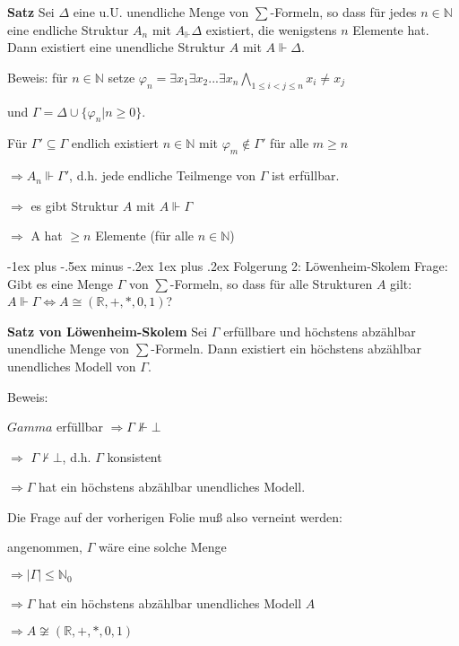\documentclass[a4paper]{article}
\makeatletter
\renewcommand{\note}[2]{\begin{noteBox} \textbf{#1} #2 \end{noteBox}}
\renewcommand{\subsubsection}{\@startsection{subsubsection}{3}{0mm}%
                {-1ex plus -.5ex minus -.2ex}%
                {1ex plus .2ex}%
                {\normalfont\small\bfseries}}
\makeatother
\begin{document}
\begin{multicols}{3}
  \note{Satz}{Sei $\Delta$ eine u.U. unendliche Menge von $\sum$-Formeln, so dass für jedes $n\in\mathbb{N}$ eine endliche Struktur $A_n$ mit $A_\Vdash\Delta$ existiert, die wenigstens $n$ Elemente hat.
    Dann existiert eine unendliche Struktur $A$ mit $A\Vdash\Delta$.}

  Beweis: für $n\in\mathbb{N}$ setze $\varphi_n=\exists x_1 \exists x_2 ...\exists x_n \bigwedge_{1\leq i< j \leq n} x_i \not= x_j$
  \begin{itemize*}
    \item und $\Gamma =\Delta\cup\{\varphi_n | n\geq 0\}$.
    \item Für $\Gamma'\subseteq\Gamma$ endlich existiert $n\in\mathbb{N}$ mit $\varphi_m\not\in\Gamma'$ für alle $m\geq n$
    \item $\Rightarrow A_n\Vdash\Gamma'$, d.h. jede endliche Teilmenge von $\Gamma$ ist erfüllbar.
    \item $\Rightarrow$ es gibt Struktur $A$ mit $A\Vdash\Gamma$
    \item $\Rightarrow$ A hat $\geq n$ Elemente (für alle $n\in\mathbb{N}$)
  \end{itemize*}

  \subsubsection{Folgerung 2: Löwenheim-Skolem}
  Frage: Gibt es eine Menge $\Gamma$ von $\sum$-Formeln, so dass für alle Strukturen $A$ gilt: $A\Vdash\Gamma \Leftrightarrow A\cong (\mathbb{R},+,*, 0 , 1 )$?

  \note{Satz von Löwenheim-Skolem}{Sei $\Gamma$ erfüllbare und höchstens abzählbar unendliche Menge von $\sum$-Formeln. Dann existiert ein höchstens abzählbar unendliches Modell von $\Gamma$.}

  Beweis:
  \begin{itemize*}
    \item $Gamma$ erfüllbar $\Rightarrow \Gamma\not\Vdash\bot$
    \item $\Rightarrow$ $\Gamma\not\vdash\bot$, d.h. $\Gamma$ konsistent
    \item $\Rightarrow \Gamma$ hat ein höchstens abzählbar unendliches Modell.
  \end{itemize*}

  Die Frage auf der vorherigen Folie muß also verneint werden:
  \begin{itemize*}
    \item angenommen, $\Gamma$ wäre eine solche Menge
    \item $\Rightarrow |\Gamma|\leq \mathbb{N}_0$
    \item $\Rightarrow \Gamma$ hat ein höchstens abzählbar unendliches Modell $A$
    \item $\Rightarrow A\not\cong (\mathbb{R},+,*, 0 , 1 )$
  \end{itemize*}



\end{multicols}
\end{document}
